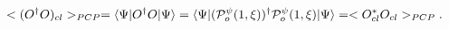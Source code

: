 \begin{equation}
\label{secondmomentum}
< (O^{\dagger}O)_{cl} >_{PCP} = 
\langle \Psi|O^{\dagger}O|\Psi \rangle = 
\langle \Psi|({\cal P}^{\psi}_o(1,\xi))^{\dagger}
{\cal P}^{\psi}_o(1,\xi)|\Psi \rangle = < O^*_{cl} O_{cl} >_{PCP}.
\end{equation}

